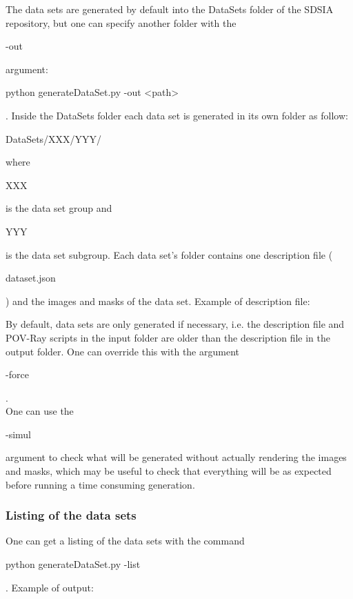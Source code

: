 The data sets are generated by default into the DataSets folder of the SDSIA repository, but one can specify another folder with the \begin{ttfamily}-out\end{ttfamily} argument: \begin{ttfamily}python generateDataSet.py -out <path>\end{ttfamily} . Inside the DataSets folder each data set is generated in its own folder as follow: \begin{ttfamily}DataSets/XXX/YYY/\end{ttfamily} where \begin{ttfamily}XXX\end{ttfamily} is the data set group and \begin{ttfamily}YYY\end{ttfamily} is the data set subgroup. Each data set's folder contains one description file (\begin{ttfamily}dataset.json\end{ttfamily}) and the images and masks of the data set. Example of description file:\\
\begin{scriptsize}
\begin{ttfamily}

\end{ttfamily}
\end{scriptsize}

By default, data sets are only generated if necessary, i.e. the description file and POV-Ray scripts in the input folder are older than the description file in the output folder. One can override this with the argument \begin{ttfamily}-force\end{ttfamily}.\\

One can use the \begin{ttfamily}-simul\end{ttfamily} argument to check what will be generated without actually rendering the images and masks, which may be useful to check that everything will be as expected before running a time consuming generation.\\

\subsubsection{Listing of the data sets}

One can get a listing of the data sets with the command \begin{ttfamily}python generateDataSet.py -list\end{ttfamily}. Example of output:\\
\begin{scriptsize}
\begin{ttfamily}

\end{ttfamily}
\end{scriptsize}

